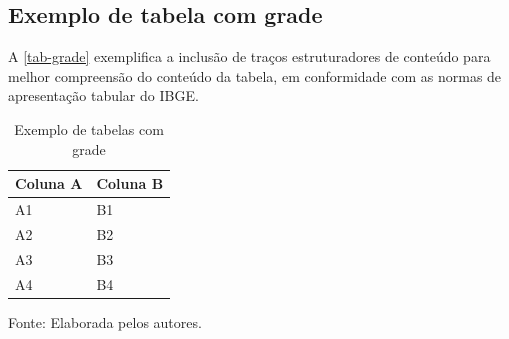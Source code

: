 \begin{apendicesenv}
\chapter{Exemplo de tabela com grade}
A \autoref{tab-grade} exemplifica a inclusão de traços estruturadores de conteúdo para melhor compreensão do conteúdo da tabela, em conformidade com as normas de apresentação tabular do IBGE.
\begin{table}[htbp]
\ABNTEXfontereduzida
\caption[Exemplo de tabelas com grade]{Exemplo de tabelas com grade}
\label{tab-grade}
\begin{tabular}{ >{\centering\arraybackslash}m{8cm} | >{\centering\arraybackslash}m{6cm} }
\hline
 \centering \textbf{Coluna A} & \textbf{Coluna B}\\
\hline
  A1 & B1\\
\hline
  A2 & B2\\
\hline
  A3 & B3\\
\hline
  A4 & B4\\
\hline
\end{tabular}
\begin{flushleft}
		Fonte: Elaborada pelos autores.\
\end{flushleft}
\end{table}


\end{apendicesenv}

\FloatBarrier

